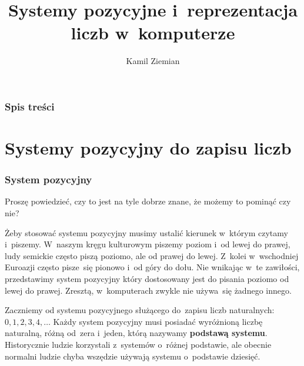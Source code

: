 \documentclass[10pt,t]{beamer}
\title{Systemy pozycyjne i~reprezentacja liczb w~komputerze}
\author{Kamil Ziemian \\
  \email}
\begin{document}





\RaggedRight





\maketitle





\begin{frame}
  \frametitle{Spis treści}


  \tableofcontents

\end{frame}


\section{Systemy pozycyjny do zapisu liczb}



\begin{frame}
  \frametitle{System pozycyjny}


  Proszę powiedzieć, czy to jest na tyle dobrze znane, że możemy to pominąć
  czy nie?

  Żeby stosować systemu pozycyjny musimy ustalić kierunek w~którym czytamy
  i~piszemy. W~naszym kręgu kulturowym piszemy poziom i~od lewej do prawej,
  ludy semickie często piszą poziomo, ale od prawej do lewej. Z~kolei
  w~wschodniej Euroazji często pisze~się pionowo i~od góry do dołu.
  Nie wnikając w~te zawiłości, przedstawimy system pozycyjny który
  dostosowany jest do pisania poziomo od lewej do prawej. Zresztą,
  w~komputerach zwykle nie używa~się żadnego innego.

  Zaczniemy od systemu pozycyjnego służącego do~zapisu liczb
  naturalnych: $0, 1, 2, 3, 4, \ldots$ Każdy system pozycyjny musi posiadać
  wyróżnioną liczbę naturalną, różną od~zera i~jeden, którą nazywamy
  \textbf{podstawą systemu}. Historycznie ludzie korzystali z~systemów
  o~różnej podstawie, ale obecnie normalni ludzie chyba wszędzie używają
  systemu o~podstawie dziesięć.

\end{frame}
\end{document}
